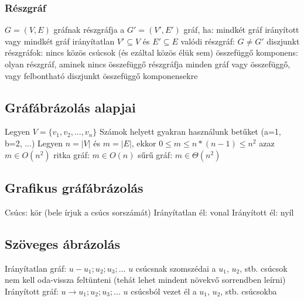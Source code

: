 \documentclass[12pt,a4paper]{article}
\begin{document}
\subsubsection{Részgráf}

\begin{outline}
	\1 $G=(V,E)$ gráfnak részgráfja a $G'=(V',E')$ gráf, ha:
		\2 mindkét gráf irányított vagy mindkét gráf irányítatlan
		\2 $V' \subseteq V$ és $E' \subseteq E$
	\1 valódi részgráf: $G \ne G'$
	\1 diszjunkt részgráfok: nincs közös csúcsok (és ezáltal közös élük sem)
	\1 összefüggő komponens: olyan részgráf, aminek nincs összefüggő részgráfja
		\2 minden gráf vagy összefüggő, vagy felbontható diszjunkt összefüggő komponensekre
\end{outline}

\pagebreak

\subsection{Gráfábrázolás alapjai}

\begin{outline}
	\1 Legyen $V=\{v_1, v_2, ..., v_n\}$
	\1 Számok helyett gyakran használunk betűket (a=1, b=2, ...)
	\1 Legyen $n=|V|$ és $m=|E|$, ekkor $0\le m \le n*(n-1) \le n^2$
		\2 azaz $m \in O(n^2)$
		\2 ritka gráf: $m \in O(n)$
		\2 sűrű gráf: $m \in \Theta(n^2)$
\end{outline}

\subsection{Grafikus gráfábrázolás}

\begin{outline}
	\1 Csúcs: kör (bele írjuk a csúcs sorszámát)
	\1 Irányítatlan él: vonal
	\1 Irányított él: nyíl
\end{outline}

\subsection{Szöveges ábrázolás}

\begin{outline}
	\1 Irányítatlan gráf: $u - u_1 ; u_2 ; u_3 ; ...$
		\2 $u$ csúcsnak szomszédai a $u_1$, $u_2$, stb. csúcsok
		\2 nem kell oda-vissza feltünteni (tehát lehet mindent növekvő sorrendben leírni)
	\1 Irányított gráf: $u \to u_1 ; u_2 ; u_3 ; ...$
		\2 $u$ csúcsból vezet él a $u_1$, $u_2$, stb. csúcsokba
\end{outline}
\end{document}

